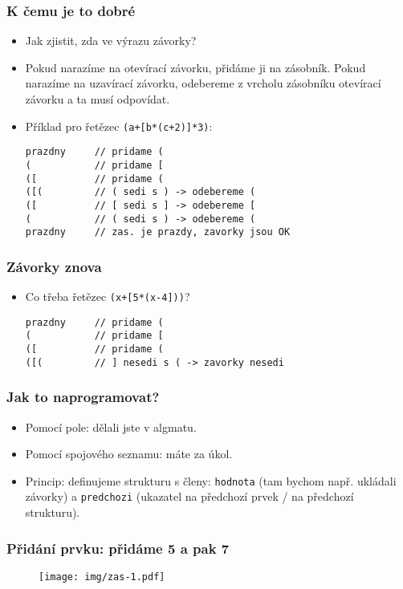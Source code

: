 \documentclass{beamer}
\newenvironment{itemizey}%
  {\large \begin{itemize}%
    \setlength{\itemsep}{6pt}%
    \setlength{\parskip}{6pt}}%
  {\end{itemize}}
\newenvironment{itemizex}%
  {\large \begin{itemize}%
    \setlength{\itemsep}{8pt}%
    \setlength{\parskip}{8pt}}%
  {\end{itemize}}
\begin{document}
\begin{frame}[t,fragile]\frametitle{K čemu je to dobré} 
    \begin{itemizey}
        \item Jak zjistit, zda ve výrazu  závorky?
        \item Pokud narazíme na otevírací závorku, přidáme ji na zásobník. Pokud narazíme na uzavírací závorku, odebereme z vrcholu zásobníku otevírací závorku a ta musí odpovídat.
        \item Příklad pro řetězec \texttt{(a+[b*(c+2)]*3)}:
\begin{verbatim}
prazdny     // pridame (
(           // pridame [
([          // pridame (
([(         // ( sedi s ) -> odebereme (
([          // [ sedi s ] -> odebereme [
(           // ( sedi s ) -> odebereme (
prazdny     // zas. je prazdy, zavorky jsou OK
\end{verbatim}
    \end{itemizey}
\end{frame}


\begin{frame}[t,fragile]\frametitle{Závorky znova} 
    \begin{itemizex}
        \item Co třeba řetězec \texttt{(x+[5*(x-4]))}?
        \begin{verbatim}
prazdny     // pridame (
(           // pridame [
([          // pridame (
([(         // ] nesedi s ( -> zavorky nesedi
        \end{verbatim}
    \end{itemizex}
\end{frame}


\begin{frame}[t,fragile]\frametitle{Jak to naprogramovat?} 
    \begin{itemizex}
        \item Pomocí pole: dělali jste v algmatu.
        \item Pomocí spojového seznamu: máte za úkol.
        \item Princip: definujeme strukturu s členy: \texttt{hodnota} (tam bychom např. ukládali závorky) a \texttt{predchozi} (ukazatel na předchozí prvek / na předchozí strukturu).
    \end{itemizex}
\end{frame}

\begin{frame}[t,fragile]\frametitle{Přidání prvku: přidáme 5 a pak 7} 
\begin{figure}[htb]
    \centering
    \texttt{[image: img/zas-1.pdf]}
\end{figure}
\end{frame}
\end{document}
